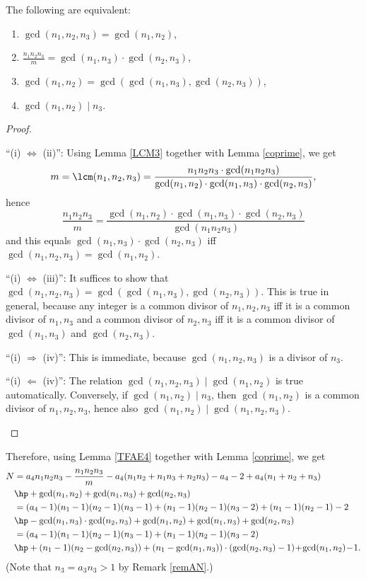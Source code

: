 \begin{lemma}\label{TFAE4}
The following are equivalent:
\begin{enumerate}[label={\upshape(\roman*)}]
\item $\gcd(n_1,n_2,n_3)=\gcd(n_1,n_2)$,
\item $\frac{n_1n_2n_3}{m}=\gcd(n_1,n_3)\cdot \gcd(n_2,n_3)$,
\item $\gcd(n_1,n_2)=\gcd(\gcd(n_1,n_3),\gcd(n_2,n_3))$,
\item $\gcd(n_1,n_2) \mid n_3$.
\end{enumerate}
\end{lemma}
\begin{proof}
\leavevmode
\begin{DESCRIPTION}%
\item[\enquote{(i) $\Leftrightarrow$ (ii)}:] Using Lemma \ref{LCM3} together with Lemma \ref{coprime}, we get 
$$m=\lcm(n_1,n_2,n_3)=\frac{n_1n_2n_3\cdot \gcd(n_1n_2n_3)}{\gcd(n_1,n_2)\cdot \gcd(n_1,n_3)\cdot\gcd(n_2,n_3)},$$
hence $$\frac{n_1n_2n_3}{m}=\frac{\gcd(n_1,n_2)\cdot \gcd(n_1,n_3)\cdot\gcd(n_2,n_3)}{\gcd(n_1n_2n_3)}$$
and this equals $\gcd(n_1,n_3)\cdot\gcd(n_2,n_3)$ iff $\gcd(n_1,n_2,n_3)=\gcd(n_1,n_2)$.
\item[\enquote{(i) $\Leftrightarrow$ (iii)}:] It suffices to show that $\gcd(n_1,n_2,n_3)=\gcd(\gcd(n_1,n_3),\gcd(n_2,n_3))$. This is true in general, because any integer is a common divisor of $n_1,n_2,n_3$ iff it is a common divisor of $n_1,n_3$ and a common divisor of $n_2,n_3$ iff it is a common divisor of $\gcd(n_1,n_3)$ and $\gcd(n_2,n_3)$. %
\item[\enquote{(i) $\Rightarrow$ (iv)}:] This is immediate, because $\gcd(n_1,n_2,n_3)$ is a divisor of $n_3$.
\item[\enquote{(i) $\Leftarrow$ (iv)}:] The relation $\gcd(n_1,n_2,n_3) \mid \gcd(n_1,n_2)$ is true automatically. Conversely, if $\gcd(n_1,n_2) \mid n_3$, then $\gcd(n_1,n_2)$ is a common divisor of $n_1,n_2,n_3$, hence also $\gcd(n_1,n_2) \mid \gcd(n_1,n_2,n_3)$.
\end{DESCRIPTION}
\end{proof}

Therefore, using Lemma \ref{TFAE4} together with Lemma \ref{coprime}, we get
\begin{align*}
N&=a_4n_1n_2n_3-\frac{n_1n_2n_3}{m}-a_4(n_1n_2+n_1n_3+n_2n_3)-a_4-2+a_4(n_1+n_2+n_3)\\
&\hp+\gcd(n_1,n_2)+\gcd(n_1,n_3)+\gcd(n_2,n_3)\\
&=(a_4-1)(n_1-1)(n_2-1)(n_3-1)+(n_1-1)(n_2-1)(n_3-2)+(n_1-1)(n_2-1)-2\\
&\hp-\gcd(n_1,n_3)\cdot\gcd(n_2,n_3)+\gcd(n_1,n_2)+\gcd(n_1,n_3)+\gcd(n_2,n_3)\\
&=(a_4-1)(n_1-1)(n_2-1)(n_3-1)+(n_1-1)(n_2-1)(n_3-2)\\
&\hp+(n_1-1)(n_2-\gcd(n_2,n_3))+(n_1-\gcd(n_1,n_3))\cdot(\gcd(n_2,n_3)-1)\!+\!\gcd(n_1,n_2)\!-\!1.
\end{align*}
(Note that $n_3=a_3n_3>1$ by Remark \ref{remAN}.)

